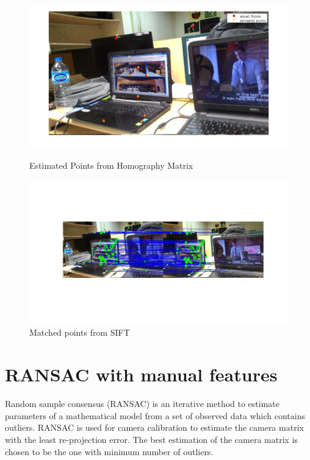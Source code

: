 \documentclass[12pt]{article}
\begin{document}
\begin{figure}[htp]
\centering
\begin{minipage}{1.0\textwidth}
\includegraphics[width=1.3\textwidth]{dltPt2manual.jpg}\hfill
\label{dltmanual}
\caption{Estimated Points from Homography Matrix}
\end{minipage}

\centering
\begin{minipage}{1.0\textwidth}
\includegraphics[width=1.0\textwidth]{siftPt.jpg}\hfill
\caption{Matched points from SIFT}
\label{dltsift}

\end{minipage}
\end{figure}



\clearpage



\section{RANSAC with manual features}
Random sample consensus (RANSAC) is an iterative method to estimate parameters of a mathematical model from a set of observed data which contains outliers. RANSAC is used for camera calibration to estimate the camera matrix with the least re-projection error.
The best estimation of the camera matrix is chosen to be the one with minimum number of outliers.
\end{document}
